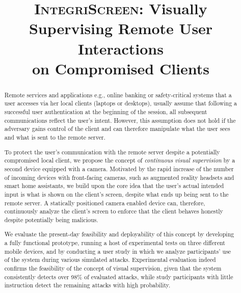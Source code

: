 \documentclass[sigconf, anonymous, balance=false]{acmart}
\newcommand{\sysname}{\textsc{IntegriScreen}\xspace}
\begin{document}
\title[\sysname: Visually Supervising Remote User Interactions on Compromised Clients]{%
\sysname: Visually Supervising Remote User Interactions\\ on Compromised Clients}
\author{}


\begin{abstract}

Remote services and applications e.g., online banking or safety-critical systems that a user accesses via her local clients (laptops or desktops), usually assume that following a successful user authentication at the beginning of the session, all subsequent communications reflect the user's intent. However, this assumption does not hold if the adversary gains control of the client and can therefore manipulate what the user sees and what is sent to the remote server.

To protect the user's communication with the remote server despite a potentially compromised local client, we propose the concept of \emph{continuous visual supervision} by a second device equipped with a camera. Motivated by the rapid increase of the number of incoming devices with front-facing cameras, such as augmented reality headsets and smart home assistants, we build upon the core idea that the user's actual intended input is what is shown on the client's screen, despite what ends up being sent to the remote server. A statically positioned camera enabled device can, therefore, continuously analyze the client's screen to enforce that the client behaves honestly despite potentially being malicious.

We evaluate the present-day feasibility and deployability of this concept by developing a fully functional prototype, running a host of experimental tests on three different mobile devices, and by conducting a user study in which we analyze participants' use of the system during various simulated attacks.
Experimental evaluation indeed confirms the feasibility of the concept of visual supervision, given that the system consistently detects over 98\% of evaluated attacks, while study participants with little instruction detect the remaining attacks with high probability.


\end{abstract}
\end{document}
